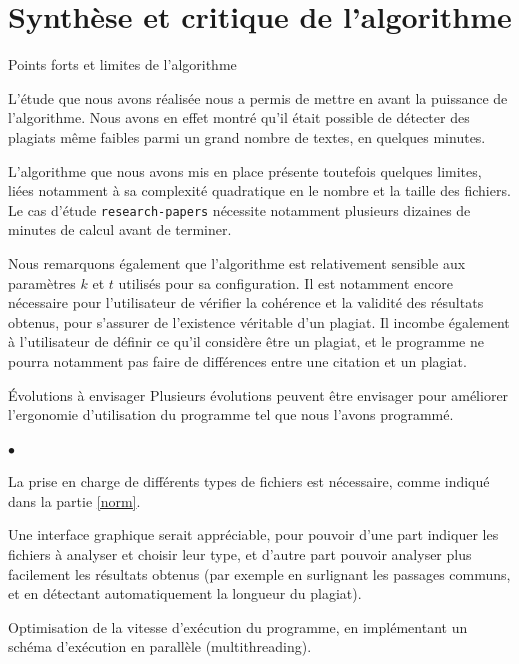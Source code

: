 \documentclass[a4paper,twoside,12pt]{article}
\newcounter{partie}
\newcounter{sous-partie}
\newenvironment{partie}[1]
{
\section{#1}
}
{

}
\newenvironment{sous-partie}[1]
{
\subsection{#1}
}
{

}
\newenvironment{liste}
{
\vspace{0.2cm}
\begin{list}{$\bullet$\hspace{0.3cm}}{\leftmargin=1.4cm}
}
{
\end{list}
\vspace{0.2cm}
}
\begin{document}
\clearpage

\begin{partie}{Synthèse et critique de l'algorithme}

\begin{sous-partie}{Points forts et limites de l'algorithme}

\begin{paragraph}{}
L'étude que nous avons réalisée nous a permis de mettre en avant la puissance de l'algorithme. Nous avons en effet montré qu'il était possible de détecter des plagiats même faibles parmi un grand nombre de textes, en quelques minutes.
\end{paragraph}

\begin{paragraph}{}
L'algorithme que nous avons mis en place présente toutefois quelques limites, liées notamment à sa complexité quadratique en le nombre et la taille des fichiers. Le cas d'étude \texttt{research-papers} nécessite notamment plusieurs dizaines de minutes de calcul avant de terminer.
\end{paragraph}

\begin{paragraph}{}
Nous remarquons également que l'algorithme est relativement sensible aux paramètres $k$ et $t$ utilisés pour sa configuration. Il est notamment encore nécessaire pour l'utilisateur de vérifier la cohérence et la validité des résultats obtenus, pour s'assurer de l'existence véritable d'un plagiat. Il incombe également à l'utilisateur de définir ce qu'il considère être un plagiat, et le programme ne pourra notamment pas faire de différences entre une citation et un plagiat.
\end{paragraph}
\end{sous-partie}

\begin{sous-partie}{Évolutions à envisager}
Plusieurs évolutions peuvent être envisager pour améliorer l'ergonomie d'utilisation du programme tel que nous l'avons programmé.
\begin{liste}
\item La prise en charge de différents types de fichiers est nécessaire, comme indiqué dans la partie \ref{norm}.
\item Une interface graphique serait appréciable, pour pouvoir d'une part indiquer les fichiers à analyser et choisir leur type, et d'autre part pouvoir analyser plus facilement les résultats obtenus (par exemple en surlignant les passages communs, et en détectant automatiquement la longueur du plagiat).
\item Optimisation de la vitesse d'exécution du programme, en implémentant un schéma d'exécution en parallèle (multithreading).
\end{liste}
\end{sous-partie}

\end{partie}
\end{document}
